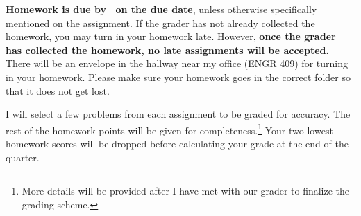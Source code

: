 \begin{description}[leftmargin=0in,itemsep=10pt]







\item[\textbf{Deadlines:}]  \textbf{Homework is due by \DueTime\ on the due date}, unless otherwise specifically mentioned on the assignment.  If the grader has not already collected the homework, you may turn in your homework late.  However, \textbf{once the grader has collected the homework, no late assignments will be accepted.}  There will be an envelope in the hallway near my office (ENGR 409) for turning in your homework.  Please make sure your homework goes in the correct folder so that it does not get lost.

\item[\textbf{Grading Scheme:}]
I will select a few problems from each assignment to be graded for accuracy.  The rest of the homework points will be given for completeness.\footnote{More details will be provided after I have met with our grader to finalize the grading scheme.}  Your two lowest homework scores will be dropped before calculating your grade at the end of the quarter.

    
\label{lastpage}

\end{description}



